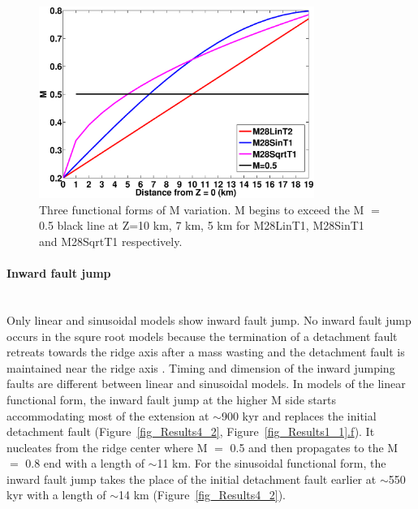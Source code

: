 \begin{figure}[h]
  \centering
    \includegraphics[width=0.8\textwidth]{./Figures/fig_Results_3_3_M_variation.eps}
  \caption{Three functional forms of M variation. M begins to exceed the M $=$ 0.5 black line at Z=10 km, 7 km, 5 km for M28LinT1, M28SinT1 and M28SqrtT1 respectively.}
 \label{fig_Results3_1}
\end{figure}   

\paragraph{Inward fault jump}\label{para_InwardFaultJump}
~\\
Only linear and sinusoidal models show inward fault jump. No inward fault jump occurs in the squre root models because the termination of a detachment fault retreats towards the ridge axis after a mass wasting and the detachment fault is maintained near the ridge axis .
Timing and dimension of the inward jumping faults are different between linear and sinusoidal models. In models of the linear functional form, the inward fault jump at the higher M side starts accommodating most of the extension at $\sim$900 kyr and replaces the initial detachment fault (Figure~\hyperref[fig_Results4_2]{\ref{fig_Results4_2}}, Figure~\hyperref[fig_Results1_1]{\ref{fig_Results1_1}.f}). It nucleates from the ridge center where M $=$ 0.5 and then propagates to the M $=$ 0.8 end with a length of $\sim$11 km. 
For the sinusoidal functional form, the inward fault jump takes the place of the initial detachment fault earlier at $\sim$550 kyr with a length of $\sim$14 km (Figure~\hyperref[fig_Results4_2]{\ref{fig_Results4_2}}).

